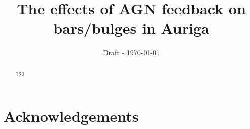 \documentclass[a4paper,usenatbib]{mnras} %
\title[The effects of AGN feedback on bars/bulges in Auriga]{The effects of AGN feedback on bars/bulges in Auriga}
\begin{document}
\date{Draft - \today}

\pagerange{\pageref{firstpage}--\pageref{lastpage}} 

\maketitle

\label{firstpage}
\begin{abstract}
123
\end{abstract}

\begin{keywords}
\end{keywords}






\section*{Acknowledgements}





\label{lastpage}
\end{document}
